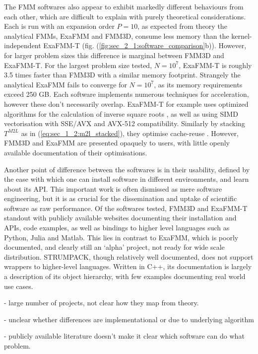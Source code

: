 The FMM softwares also appear to exhibit markedly different behaviours from each other, which are difficult to explain with purely theoretical considerations. Each is run with an expansion order $P=10$, as expected from theory the analytical FMMs, ExaFMM and FMM3D, consume less memory than the kernel-independent ExaFMM-T (fig. (\ref{fig:sec_2_1:software_comparison}b)). However, for larger problem sizes this difference is marginal between FMM3D and ExaFMM-T. For the largest problem size tested, $N=10^7$, ExaFMM-T is roughly 3.5 times faster than FMM3D with a similar memory footprint. Strangely the analytical ExaFMM fails to converge for $N=10^7$, as its memory requirements exceed 250 GB. Each software implements numerous techniques for acceleration, however these don't necessarily overlap. ExaFMM-T for example uses optimized algorithms for the calculation of inverse square roots \cite{malhotra2015pvfmm}, as well as using SIMD vectorisation with SSE/AVX and AVX-512 compatibility. Similarly by stacking $T^{M2L}$ as in (\ref{eq:sec_1_2:m2l_stacked}), they optimise cache-reuse \cite{wang2021exafmm}. However, FMM3D and ExaFMM are presented opaquely to users, with little openly available documentation of their optimisations.

Another point of difference between the softwares is in their usability, defined by the ease with which one can install software in different environments, and learn about its API. This important work is often dismissed as mere software engineering, but it is as crucial for the dissemination and uptake of scientific software as raw performance. Of the softwares tested, FMM3D and ExaFMM-T standout with publicly available websites documenting their installation and APIs, code examples, as well as bindings to higher level languages such as Python, Julia and Matlab. This lies in contrast to ExaFMM, which is poorly documented, and clearly still an `alpha' project, not ready for wide scale distribution. STRUMPACK, though relatively well documented, does not support wrappers to higher-level languages. Written in C++, its documentation is largely a description of its object hierarchy, with few examples documenting real world use cases.

- large number of projects, not clear how they map from theory. 

- unclear whether differences are implementational or due to underlying algorithm

- publicly available literature doesn't make it clear which software can do what problem. 

